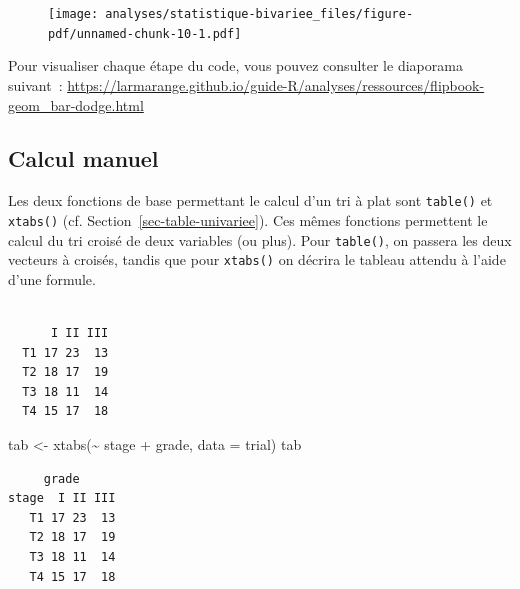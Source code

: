 \documentclass[
  letterpaper,
  DIV=11,
  numbers=noendperiod,
  oneside]{scrreprt}
\newenvironment{Shaded}{\begin{snugshade}}{\end{snugshade}}
\newcommand{\AttributeTok}[1]{\textcolor[rgb]{0.40,0.45,0.13}{#1}}
\newcommand{\FunctionTok}[1]{\textcolor[rgb]{0.28,0.35,0.67}{#1}}
\newcommand{\NormalTok}[1]{\textcolor[rgb]{0.00,0.23,0.31}{#1}}
\newcommand{\OtherTok}[1]{\textcolor[rgb]{0.00,0.23,0.31}{#1}}
\newcommand{\SpecialCharTok}[1]{\textcolor[rgb]{0.37,0.37,0.37}{#1}}
\begin{document}
\begin{tcolorbox}
\begin{figure}[H]

{\centering \texttt{[image: analyses/statistique-bivariee\_files/figure-pdf/unnamed-chunk-10-1.pdf]}

}

\end{figure}

\end{tcolorbox}

Pour visualiser chaque étape du code, vous pouvez consulter le diaporama
suivant~:
\url{https://larmarange.github.io/guide-R/analyses/ressources/flipbook-geom_bar-dodge.html}

\hypertarget{calcul-manuel-2}{%
\subsection{Calcul manuel}\label{calcul-manuel-2}}

Les deux fonctions de base permettant le calcul d'un tri à plat sont
\texttt{table()} et \texttt{xtabs()} (cf.
Section~\ref{sec-table-univariee}). Ces mêmes fonctions permettent le
calcul du tri croisé de deux variables (ou plus). Pour \texttt{table()},
on passera les deux vecteurs à croisés, tandis que pour \texttt{xtabs()}
on décrira le tableau attendu à l'aide d'une formule.

\begin{Shaded}
\end{Shaded}

\begin{verbatim}
    
      I II III
  T1 17 23  13
  T2 18 17  19
  T3 18 11  14
  T4 15 17  18
\end{verbatim}

\begin{Shaded}
\begin{Highlighting}[]
\NormalTok{tab }\OtherTok{\textless{}{-}} \FunctionTok{xtabs}\NormalTok{(}\SpecialCharTok{\textasciitilde{}}\NormalTok{ stage }\SpecialCharTok{+}\NormalTok{ grade, }\AttributeTok{data =}\NormalTok{ trial)}
\NormalTok{tab}
\end{Highlighting}
\end{Shaded}

\begin{verbatim}
     grade
stage  I II III
   T1 17 23  13
   T2 18 17  19
   T3 18 11  14
   T4 15 17  18
\end{verbatim}
\end{document}
